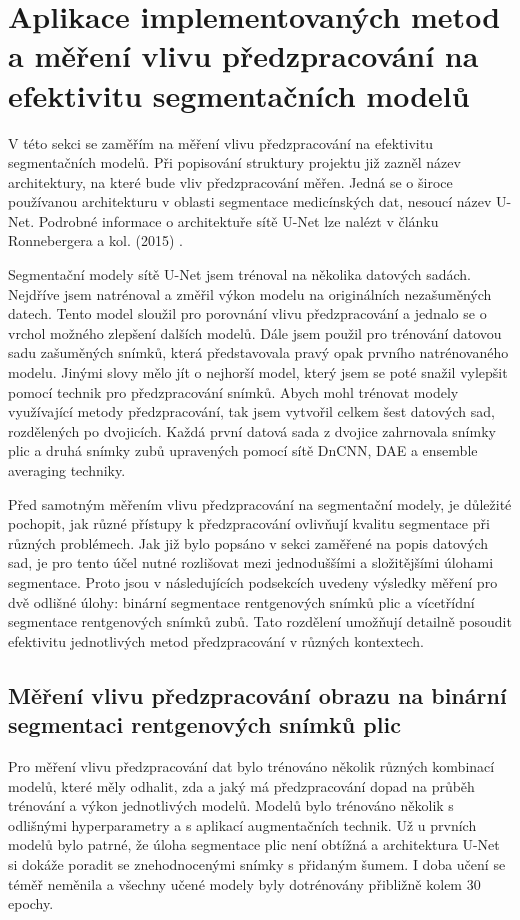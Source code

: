 \documentclass[male,czech,api_ing]{thesis}
\begin{document}
\section{Aplikace implementovaných metod a měření vlivu předzpracování na efektivitu segmentačních modelů}
V této sekci se zaměřím na měření vlivu předzpracování na efektivitu segmentačních modelů. Při popisování struktury projektu již zazněl název architektury, na které bude vliv předzpracování měřen. Jedná se o široce používanou architekturu v oblasti segmentace medicínských dat, nesoucí název U-Net. Podrobné informace o architektuře sítě U-Net lze nalézt v článku Ronnebergera a kol. (2015) \cite{UNET_paper}.

Segmentační modely sítě U-Net jsem trénoval na několika datových sadách. Nejdříve jsem natrénoval a změřil výkon modelu na originálních nezašuměných datech. Tento model sloužil pro porovnání vlivu předzpracování a jednalo se o vrchol možného zlepšení dalších modelů. Dále jsem použil pro trénování datovou sadu zašuměných snímků, která představovala pravý opak prvního natrénovaného modelu. Jinými slovy mělo jít o nejhorší model, který jsem se poté snažil vylepšit pomocí technik pro předzpracování snímků. Abych mohl trénovat modely využívající metody předzpracování, tak jsem vytvořil celkem šest datových sad, rozdělených po dvojicích. Každá první datová sada z dvojice zahrnovala snímky plic a druhá snímky zubů upravených pomocí sítě DnCNN, DAE a ensemble averaging techniky.

Před samotným měřením vlivu předzpracování na segmentační modely, je důležité pochopit, jak různé přístupy k předzpracování ovlivňují kvalitu segmentace při různých problémech. Jak již bylo popsáno v sekci zaměřené na popis datových sad, je pro tento účel nutné rozlišovat mezi jednoduššími a složitějšími úlohami segmentace. Proto jsou v následujících podsekcích uvedeny výsledky měření pro dvě odlišné úlohy: binární segmentace rentgenových snímků plic a vícetřídní segmentace rentgenových snímků zubů. Tato rozdělení umožňují detailně posoudit efektivitu jednotlivých metod předzpracování v různých kontextech.

\subsection{Měření vlivu předzpracování obrazu na binární segmentaci rentgenových snímků plic}
Pro měření vlivu předzpracování dat bylo trénováno několik různých kombinací modelů, které měly odhalit, zda a jaký má předzpracování dopad na průběh trénování a výkon jednotlivých modelů. Modelů bylo trénováno několik s odlišnými hyperparametry a s aplikací augmentačních technik. Už u prvních modelů bylo patrné, že úloha segmentace plic není obtížná a architektura U-Net si dokáže poradit se znehodnocenými snímky s přidaným šumem. I doba učení se téměř neměnila a všechny učené modely byly dotrénovány přibližně kolem 30 epochy. 
\end{document}

